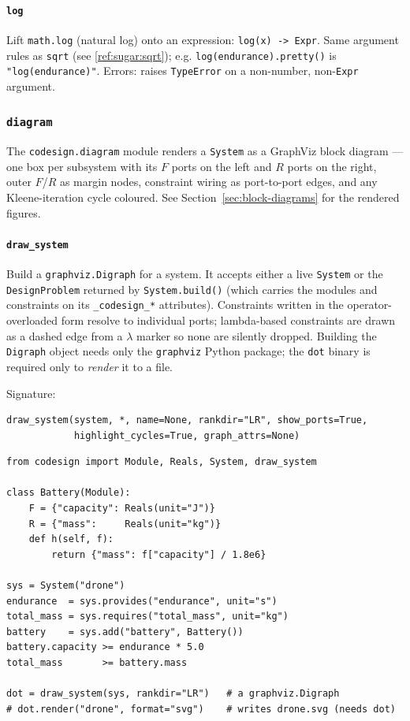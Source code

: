 \documentclass[11pt,a4paper]{article}
\begin{document}
\paragraph{\texttt{log}}\label{ref:sugar:log}
Lift \texttt{math.log} (natural log) onto an expression:
\texttt{log(x) -> Expr}. Same argument rules as \texttt{sqrt} (see
\ref{ref:sugar:sqrt}); e.g. \texttt{log(endurance).pretty()} is
\texttt{"log(endurance)"}. Errors: raises \texttt{TypeError} on a
non-number, non-\texttt{Expr} argument.

\subsubsection{\texttt{diagram}}
\label{ref:diagram}

The \texttt{codesign.diagram} module renders a \texttt{System} as a
GraphViz block diagram --- one box per subsystem with its $F$ ports on the
left and $R$ ports on the right, outer $F$/$R$ as margin nodes, constraint
wiring as port-to-port edges, and any Kleene-iteration cycle coloured. See
Section~\ref{sec:block-diagrams} for the rendered figures.

\paragraph{\texttt{draw\_system}}\label{ref:diagram:draw_system}
Build a \texttt{graphviz.Digraph} for a system. It accepts either a live
\texttt{System} or the \texttt{DesignProblem} returned by
\texttt{System.build()} (which carries the modules and constraints on its
\texttt{\_codesign\_*} attributes). Constraints written in the
operator-overloaded form resolve to individual ports; lambda-based
constraints are drawn as a dashed edge from a \texttt{$\lambda$} marker so
none are silently dropped. Building the \texttt{Digraph} object needs only
the \texttt{graphviz} Python package; the \texttt{dot} binary is required
only to \emph{render} it to a file.

Signature:
\begin{lstlisting}
draw_system(system, *, name=None, rankdir="LR", show_ports=True,
            highlight_cycles=True, graph_attrs=None)
\end{lstlisting}

\begin{lstlisting}
from codesign import Module, Reals, System, draw_system

class Battery(Module):
    F = {"capacity": Reals(unit="J")}
    R = {"mass":     Reals(unit="kg")}
    def h(self, f):
        return {"mass": f["capacity"] / 1.8e6}

sys = System("drone")
endurance  = sys.provides("endurance", unit="s")
total_mass = sys.requires("total_mass", unit="kg")
battery    = sys.add("battery", Battery())
battery.capacity >= endurance * 5.0
total_mass       >= battery.mass

dot = draw_system(sys, rankdir="LR")   # a graphviz.Digraph
# dot.render("drone", format="svg")    # writes drone.svg (needs dot)
\end{lstlisting}
\end{document}
